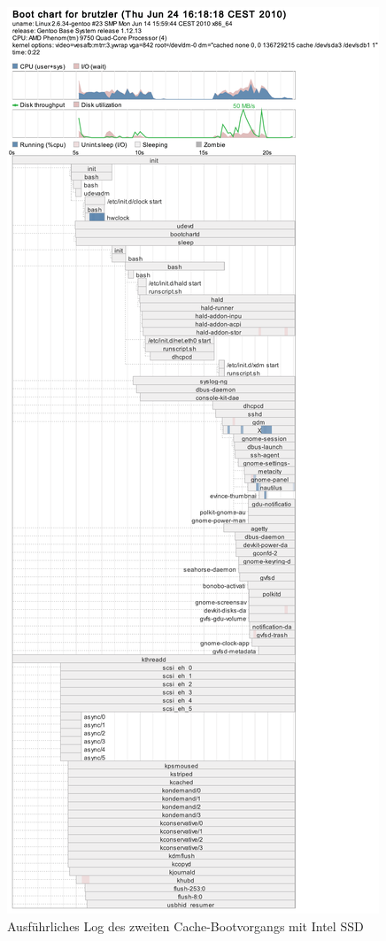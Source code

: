 \begin{figure}[H]\centering
	\includegraphics[scale=0.4]{figures/appendix/bootchart-cache2_intel}
    \caption{Ausführliches Log des zweiten Cache-Bootvorgangs mit Intel SSD}
    \label{img:bootchart-cache2:intel}
\end{figure}

